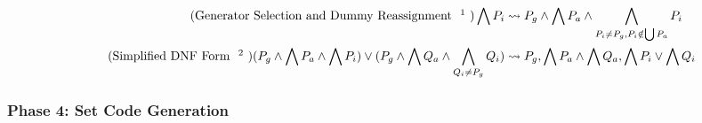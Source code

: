 \documentclass{article}
\newcommand{\bSet}[3]{%
  \{\, #1 \cdot #2 \mid #3 \, \}%
}
\begin{document}
\noindent\begin{minipage}{\linewidth}
\begin{align}
  \tag{Generator Selection and Dummy Reassignment \footnote{The LH term must occur inside a quantifier's predicate - one match per or-clause. $P_g$ is the generator, a single clause distinguished from the rest of $\bigwedge P_i$.\\
  Dummy Reassignment uses assignment to calculate expressions outside of the if-statement. For example, $\bSet{x}{x \in S \land z = f(x)}{z}$ indirectly binds $z$ (if $z$ is free), although $z$ does not appear in the quantifier list. This may be less efficient for simple cases than directly rewriting all occurrences of z to f(x), but additional conditions that make use of z would benefit from the intermediate calculation. $P_a$ is an ordered list of such assignments (drawn from $\bigwedge P_i$), so that additional layers of indirection may be accommodated. The expectation is that LLVM will filter out superfluous assignments, though we will test this assumption later.\\Right now, we just make a naive selection of generator (ie., the first viable option). Later, this will be more intelligent.}}
  \bigwedge P_i
  &\leadsto
  P_g \land \bigwedge P_a \land \bigwedge_{P_i \neq P_g, P_i \notin \bigcup P_a} P_i
  \\
  \tag{Simplified DNF Form \footnote{The LH term must occur inside a quantifier's predicate. Combines clauses with the same generator. Requires Generator Selection to be run first}}
  (P_{g} \land \bigwedge P_a \land \bigwedge P_i) \lor (P_{g} \land \bigwedge Q_a \land \bigwedge_{Q_i \neq P_g} Q_i)
  &\leadsto
  P_g, \bigwedge P_a \land \bigwedge Q_a,\bigwedge P_i \lor \bigwedge Q_i
\end{align}
\end{minipage}

\subsubsection{Phase 4: Set Code Generation}
\end{document}
